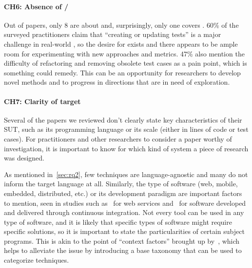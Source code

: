 \paragraph{CH6: Absence of \tsr/\tsa}
Out of \numpapers papers, only 8 are about \tsr and, surprisingly, only one covers \tsa 
 .
60\% of the surveyed practitioners claim that ``creating or updating tests'' is a major challenge in real-world \rt, so the desire for \tsa exists and there appears to be ample room for experimenting with new approaches and metrics.
47\% also mention the difficulty of refactoring and removing obsolete test cases as a pain point, which is something \tsr could remedy.
This can be an opportunity for researchers to develop novel methods and to progress in directions that are in need of exploration.

\paragraph{CH7: Clarity of target}
Several of the papers we reviewed don't clearly state key characteristics of their SUT, such as its programming language or its scale (either in lines of code or test cases).
For practitioners and other researchers to consider a paper worthy of investigation, it is important to know for which kind of system a piece of research was designed.

As mentioned in~\autoref{sec:rq2}, few \rt techniques are language-agnostic and many do not inform the target language at all.
Similarly, the type of software (web, mobile, embedded, distributed, etc.) or its development paradigm are important factors to mention, seen in studies such as~ for web services and~ for software developed and delivered through continuous integration.
Not every tool can be used in any type of software, and it is likely that specific types of software might require specific solutions, so it is important to state the particularities of certain subject programs.
This is akin to the point of ``context factors'' brought up by~\citet{bin_ali_search_2019}, which helps to alleviate the issue by introducing a base taxonomy that can be used to categorize techniques.

